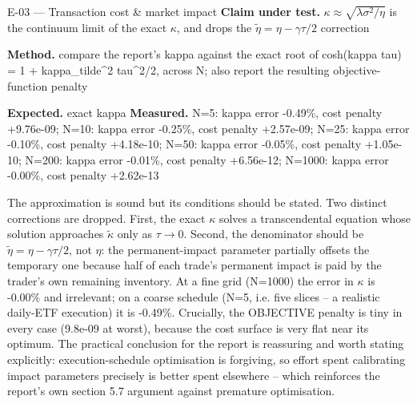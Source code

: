 \begin{caveat}{E-03 \; ---  Transaction cost \& market impact}
\textbf{Claim under test.} $\kappa\approx\sqrt{\lambda\sigma^2/\eta}$ is the continuum limit of the exact $\kappa$, and drops the $\tilde\eta=\eta-\gamma\tau/2$ correction

\textbf{Method.} compare the report's kappa against the exact root of cosh(kappa tau) = 1 + kappa\_tilde\textasciicircum{}2 tau\textasciicircum{}2/2, across N; also report the resulting objective-function penalty

\textbf{Expected.} exact kappa \quad \textbf{Measured.} N=5: kappa error -0.49\%, cost penalty +9.76e-09; N=10: kappa error -0.25\%, cost penalty +2.57e-09; N=25: kappa error -0.10\%, cost penalty +4.18e-10; N=50: kappa error -0.05\%, cost penalty +1.05e-10; N=200: kappa error -0.01\%, cost penalty +6.56e-12; N=1000: kappa error -0.00\%, cost penalty +2.62e-13

The approximation is sound but its conditions should be stated. Two distinct corrections are dropped. First, the exact $\kappa$ solves a transcendental equation whose solution approaches $\tilde\kappa$ only as $\tau\to0$. Second, the denominator should be $\tilde\eta=\eta-\gamma\tau/2$, not $\eta$: the permanent-impact parameter partially offsets the temporary one because half of each trade's permanent impact is paid by the trader's own remaining inventory. At a fine grid (N=1000) the error in $\kappa$ is -0.00\% and irrelevant; on a coarse schedule (N=5, i.e. five slices -- a realistic daily-ETF execution) it is -0.49\%. Crucially, the OBJECTIVE penalty is tiny in every case (9.8e-09 at worst), because the cost surface is very flat near its optimum. The practical conclusion for the report is reassuring and worth stating explicitly: execution-schedule optimisation is forgiving, so effort spent calibrating impact parameters precisely is better spent elsewhere -- which reinforces the report's own section 5.7 argument against premature optimisation.
\end{caveat}

